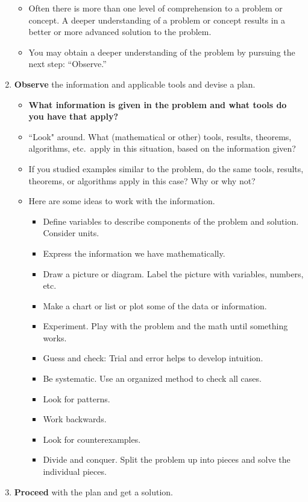 \begin{enumerate}
\begin{itemize}
    \item Often there is more than one level of comprehension to a problem or concept. A deeper understanding of a problem or concept results in a better or more advanced solution to the problem.
    \item You may obtain a deeper understanding of the problem by pursuing the next step: ``Observe.''
\end{itemize}
\item {\bf Observe} the information and applicable tools and devise a plan.
\begin{itemize}
    \item {\bf What information is given in the problem and what tools do you have that apply?}
    \item ``Look" around. What (mathematical or other) tools, results, theorems, algorithms, etc.\ apply in this situation, based on the information given?
    \item If you studied examples similar to the problem, do the same tools, results, theorems, or algorithms apply in this case? Why or why not?
    \item Here are some ideas to work with the information.
    \begin{itemize}
        \item Define variables to describe components of the problem and solution. Consider units.
        \item Express the information we have mathematically.
        \item Draw a picture or diagram. Label the picture with variables, numbers, etc.
        \item Make a chart or list or plot some of the data or information.
        \item Experiment. Play with the problem and the math until something works.
        \item Guess and check: Trial and error helps to develop intuition.
        \item Be systematic. Use an organized method to check all cases.
        \item Look for patterns.
        \item Work backwards.
        \item Look for counterexamples.
        \item Divide and conquer. Split the problem up into pieces and solve the individual pieces.
    \end{itemize}
\end{itemize}
\item {\bf Proceed} with the plan and get a solution.

\end{enumerate}
